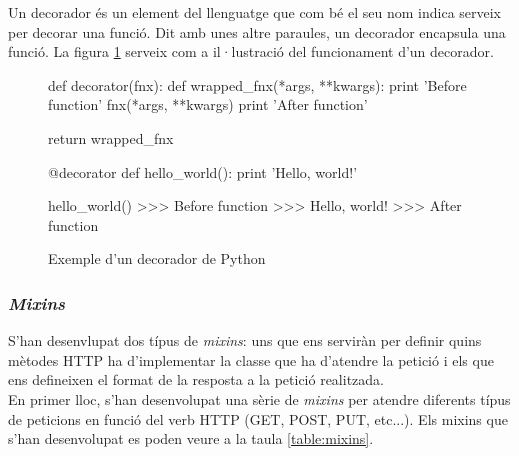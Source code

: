 Un decorador és un element del llenguatge que com bé el seu nom indica serveix per decorar una funció. Dit amb unes altre paraules, un decorador encapsula una funció. La figura \ref{fig:decorator} serveix com a il·lustració del funcionament d'un decorador.

\begin{figure}[h!]
	\begin{python}
def decorator(fnx):
	def wrapped_fnx(*args, **kwargs):
		print 'Before function'
		fnx(*args, **kwargs)
		print 'After function'

	return wrapped_fnx

@decorator
def hello_world():
	print 'Hello, world!'

hello_world()
>>> Before function
>>> Hello, world!
>>> After function
	\end{python}
	\label{fig:decorator}
	\caption{Exemple d'un decorador de Python}
\end{figure}

\subsubsection{\emph{Mixins}}

S'han desenvlupat dos típus de \emph{mixins}: uns que ens serviràn per definir quins mètodes \ac{HTTP} ha d'implementar la classe que ha d'atendre la petició i els que ens defineixen el format de la resposta a la petició realitzada. \\

En primer lloc, s'han desenvolupat una sèrie de \emph{mixins} per atendre diferents típus de peticions en funció del verb \ac{HTTP} (GET, POST, PUT, etc...). Els mixins que s'han desenvolupat es poden veure a la taula \ref{table:mixins}.\\

